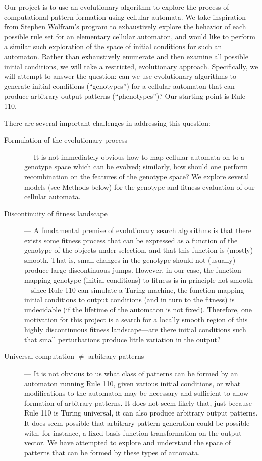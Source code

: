 \documentclass[twocolumn]{article}
\begin{document}
Our project is to use an evolutionary algorithm to explore the process of computational pattern formation using cellular automata. We take inspiration from Stephen Wolfram’s program to exhaustively explore the behavior of each possible rule set for an elementary cellular automaton, and would like to perform a similar such exploration of the space of initial conditions for such an automaton. Rather than exhaustively enumerate and then examine all possible initial conditions, we will take a restricted, evolutionary approach. Specifically, we will attempt to answer the question: can we use evolutionary algorithms to generate initial conditions (``genotypes'') for a cellular automaton that can produce arbitrary output patterns (``phenotypes'')? Our starting point is Rule 110. 

There are several important challenges in addressing this question:
\begin{description}
\item[Formulation of the evolutionary process] --- It is not immediately obvious how to map cellular automata on to a genotype space which can be evolved; similarly, how should one perform recombination on the features of the genotype space? We explore several models (see Methods below) for the genotype and fitness evaluation of our cellular automata. 
\item[Discontinuity of fitness landscape] ---  A fundamental premise of evolutionary search algorithms is that there exists some fitness process that can be expressed as a function of the genotype of the objects under selection, and that this function is (mostly) smooth. That is, small changes in the genotype should not (usually) produce large discontinuous jumps. However, in our case, the function mapping genotype (initial conditions) to fitness is in principle not smooth---since Rule 110 can simulate a Turing machine, the function mapping initial conditions to output conditions (and in turn to the fitness) is undecidable (if the lifetime of the automaton is not fixed). Therefore, one motivation for this project is a search for a locally smooth region of this highly discontinuous fitness landscape---are there initial conditions such that small perturbations produce little variation in the output?
\item[Universal computation $\ne$ arbitrary patterns] --- It is not obvious to us what class of patterns can be formed by an automaton running Rule 110, given various initial conditions, or what modifications to the automaton may be necessary and sufficient to allow formation of arbitrary patterns. It does not seem likely that, just because Rule 110 is Turing universal, it can also produce arbitrary output patterns. It does seem possible that arbitrary pattern generation could be possible with, for instance, a fixed basis function transformation on the output vector. We have attempted to explore and understand the space of patterns that can be formed by these types of automata.
\end{description}
\end{document}
